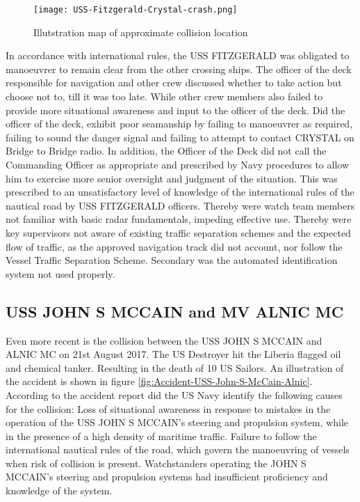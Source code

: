 \begin{figure}[H]
	\centering
	\texttt{[image: USS-Fitzgerald-Crystal-crash.png]}
	\caption{Illutstration map of approximate collision location}
	\label{fig:Accident-USS-Fitzgerald-Crystal}
\end{figure}

In accordance with international rules, the USS FITZGERALD was obligated to manoeuvrer to remain clear from the other crossing ships. The officer of the deck responsible for navigation and other crew discussed whether to take action but choose not to, till it was too late. While other crew members also failed to provide more situational awareness and input to the officer of the deck. Did the officer of the deck, exhibit poor seamanship by failing to manoeuvrer as required, failing to sound the danger signal and failing to attempt to contact CRYSTAL on Bridge to Bridge radio. In addition, the Officer of the Deck did not call the Commanding Officer as appropriate and prescribed by Navy procedures to allow him to exercise more senior oversight and judgment of the situation. This was prescribed to an unsatisfactory level of knowledge of the international rules of the nautical road by USS FITZGERALD officers. Thereby were watch team members not familiar with basic radar fundamentals, impeding effective use. Thereby were key supervisors not aware of existing traffic separation schemes and the expected flow of traffic, as the approved navigation track did not account, nor follow the Vessel Traffic Separation Scheme. Secondary was the automated identification system not used properly. \cite{USNavy2017}

\newpage
\subsection{USS JOHN S MCCAIN and MV ALNIC MC}
Even more recent is the collision between the USS JOHN S MCCAIN and ALNIC MC on 21st August 2017. The US Destroyer hit the Liberia flagged oil and chemical tanker. Resulting in the death of 10  US Sailors. An illustration of the accident is shown in figure \ref{fig:Accident-USS-John-S-McCain-Alnic}. According to the accident report did the US Navy identify the following causes for the collision: Loss of situational awareness in response to mistakes in the operation of the USS JOHN S MCCAIN's steering and propulsion system, while in the presence of a high density of maritime traffic. Failure to follow the international nautical rules of the road, which govern the manoeuvring of vessels when risk of collision is present. Watchstanders operating the JOHN S MCCAIN's steering and propulsion systems had insufficient proficiency and knowledge of the system. 

